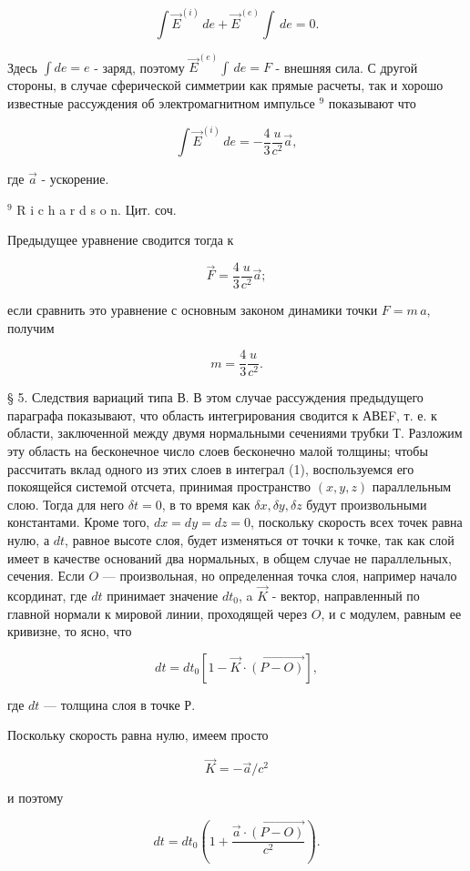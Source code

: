 \documentclass[11pt]{article}
\begin{document}
\[\int {\vec {E}}^{(i)} \, de + {\vec {E}}^{(e)} \int\, de = 0.\]

    Здесь \(\int de = e\) - заряд, поэтому \({\vec {E}}^{(e)} \int\, de = F\) -
внешняя сила. С другой стороны, в случае сферической симметрии как
прямые расчеты, так и хорошо известные рассуждения об электромагнитном
импульсе \(^{9}\) показывают что

\[\int {\vec {E}}^{(i)} \, de = - \frac{4}{3} \frac{u}{c^2} \vec{a},\]

где \(\vec{a}\) - ускорение.

    \(^{9}\) R i c h a r d s o n. Цит. соч.

    Предыдущее уравнение сводится тогда к

\[\vec{F} = \frac{4}{3} \frac{u}{c^2} \vec{a};\]

если сравнить это уравнение с основным законом динамики точки
\(F = m \, a\), получим

\[m = \frac{4}{3} \frac{u}{c^2}.\]

    § 5. Следствия вариаций типа В. В этом случае рассуждения предыдущего
параграфа показывают, что область интегрирования сводится к АВЕF, т. е.
к области, заключенной между двумя нормальными сечениями трубки Т.
Разложим эту область на бесконечное число слоев бесконечно малой
толщины; чтобы рассчитать вклад одного из этих слоев в интеграл (1),
воспользуемся его покоящейся системой отсчета, принимая пространство
\((x,y,z)\) параллельным слою. Тогда для него \(\delta t = 0\), в то
время как \(\delta x, \delta y, \delta z\) будут произвольными
константами. Кроме того, \(dx = dy = dz = 0\), поскольку скорость всех
точек равна нулю, а \(dt\), равное высоте слоя, будет изменяться от
точки к точке, так как слой имеет в качестве оснований два нормальных, в
общем случае не параллельных, сечения. Если \(O\) --- произвольная, но
определенная точка слоя, например начало ксординат, где \(dt\) принимает
значение \(dt_0\), a \(\vec K\) - вектор, направленный по главной
нормали к мировой линии, проходящей через \(O\), и с модулем, равным ее
кривизне, то ясно, что

\[dt = dt_0 \left[1 - \vec K \cdot \overrightarrow{\left(P - O\right)}\right],\]

где \(dt\) --- толщина слоя в точке Р.

    Поскольку скорость равна нулю, имеем просто

\[\vec {K} = - \vec {a}/c^2\]

и поэтому

\[ dt = dt_0\left (1 + \frac{\vec {a} \cdot \overrightarrow{\left(P - O\right)}}{c^2}\right).\]
\end{document}
